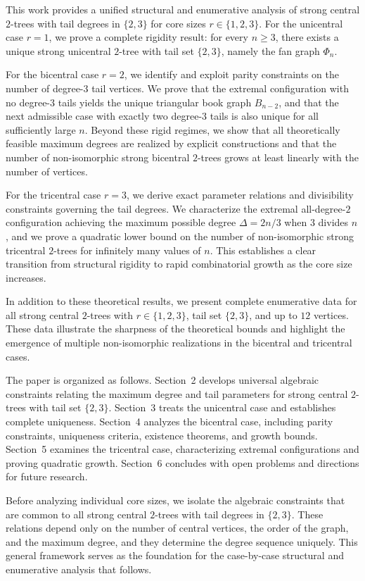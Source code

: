 \documentclass[12pt]{article}
\numberwithin{equation}{section}
\begin{document}
This work provides a unified structural and enumerative analysis of strong central $2$-trees with tail degrees in $\{2,3\}$ for core sizes $r\in\{1,2,3\}$.
For the unicentral case $r=1$, we prove a complete rigidity result: for every $n\ge 3$, there exists a unique strong unicentral $2$-tree with tail set $\{2,3\}$, namely the fan graph $\Phi_n$.

For the bicentral case $r=2$, we identify and exploit parity constraints on the number of degree-$3$ tail vertices.
We prove that the extremal configuration with no degree-$3$ tails yields the unique triangular book graph $B_{n-2}$, and that the next admissible case with exactly two degree-$3$ tails is also unique for all sufficiently large $n$.
Beyond these rigid regimes, we show that all theoretically feasible maximum degrees are realized by explicit constructions and that the number of non-isomorphic strong bicentral $2$-trees grows at least linearly with the number of vertices.

For the tricentral case $r=3$, we derive exact parameter relations and divisibility constraints governing the tail degrees.
We characterize the extremal all-degree-$2$ configuration achieving the maximum possible degree $\Delta=2n/3$ when $3$ divides $n$, and we prove a quadratic lower bound on the number of non-isomorphic strong tricentral $2$-trees for infinitely many values of $n$.
This establishes a clear transition from structural rigidity to rapid combinatorial growth as the core size increases.

In addition to these theoretical results, we present complete enumerative data for all strong central $2$-trees with $r\in\{1,2,3\}$, tail set $\{2,3\}$, and up to $12$ vertices.
These data illustrate the sharpness of the theoretical bounds and highlight the emergence of multiple non-isomorphic realizations in the bicentral and tricentral cases.

The paper is organized as follows.
Section~2 develops universal algebraic constraints relating the maximum degree and tail parameters for strong central $2$-trees with tail set $\{2,3\}$.
Section~3 treats the unicentral case and establishes complete uniqueness.
Section~4 analyzes the bicentral case, including parity constraints, uniqueness criteria, existence theorems, and growth bounds.
Section~5 examines the tricentral case, characterizing extremal configurations and proving quadratic growth.
Section~6 concludes with open problems and directions for future research.

Before analyzing individual core sizes, we isolate the algebraic constraints that are common to all strong central $2$-trees with tail degrees in $\{2,3\}$. These relations depend only on the number of central vertices, the order of the graph, and the maximum degree, and they determine the degree sequence uniquely. This general framework serves as the foundation for the case-by-case structural
and enumerative analysis that follows.
\end{document}
